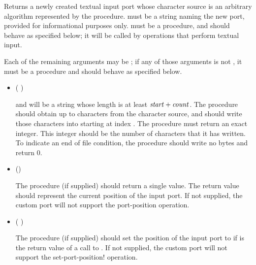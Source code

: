 \begin{entry}{%
}

Returns a newly created textual input port whose character source is
an arbitrary algorithm represented by the  procedure.
 must be a string naming the new port,
provided for informational purposes only.
 must be a procedure, and should behave as specified
below; it will be called by operations that perform textual input.

Each of the remaining arguments may be \schfalse{}; if any of
those arguments is not \schfalse{}, it must be a procedure and
should behave as specified below.
   
\begin{itemize}
\item {\cf (   )}
       
  and  will be a string whose length is at least
  $\textnormal{\textit{start}} + \textnormal{\textit{count}}$.
  The  procedure should obtain up to  characters
  from the character source, and should write those characters
  into  starting at index .
  The  procedure must return an exact integer.  This
  integer should be the number of characters that it has written.
  To indicate an end of file condition, the 
  procedure should write no bytes and return 0.

\item {\cf ()}
       
  The  procedure (if supplied) should return a single
  value.  The return value should represent the current position of
  the input port.  If not supplied, the custom port will not support
  the {\cf port-position} operation.
  
\item {\cf ( )}
       
  The  procedure (if supplied) should set the
  position of the input port to  if  is the return
  value of a call to .  If not supplied, the custom
  port will not support the {\cf set-port-position!} operation.
       

\end{itemize}
\end{entry}

